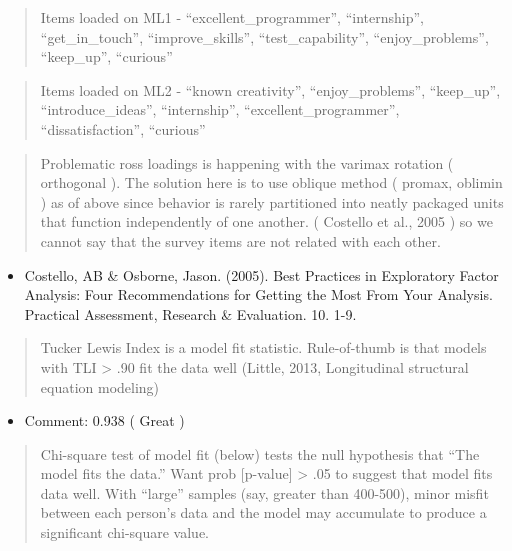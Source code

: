 \documentclass[
]{article}
\providecommand{\tightlist}{%
  \setlength{\itemsep}{0pt}\setlength{\parskip}{0pt}}
\begin{document}
\begin{quote}
Items loaded on ML1 - ``excellent\_programmer'', ``internship'',
``get\_in\_touch'', ``improve\_skills'', ``test\_capability'',
``enjoy\_problems'', ``keep\_up'', ``curious''
\end{quote}

\begin{quote}
Items loaded on ML2 - ``known creativity'', ``enjoy\_problems'',
``keep\_up'', ``introduce\_ideas'', ``internship'',
``excellent\_programmer'', ``dissatisfaction'', ``curious''
\end{quote}

\begin{quote}
Problematic ross loadings is happening with the varimax rotation (
orthogonal ). The solution here is to use oblique method ( promax,
oblimin ) as of above since behavior is rarely partitioned into neatly
packaged units that function independently of one another. ( Costello et
al., 2005 ) so we cannot say that the survey items are not related with
each other.
\end{quote}

\begin{itemize}
\tightlist
\item
  Costello, AB \& Osborne, Jason. (2005). Best Practices in Exploratory
  Factor Analysis: Four Recommendations for Getting the Most From Your
  Analysis. Practical Assessment, Research \& Evaluation. 10. 1-9.
\end{itemize}

\begin{quote}
Tucker Lewis Index is a model fit statistic. Rule-of-thumb is that
models with TLI \textgreater{} .90 fit the data well (Little, 2013,
Longitudinal structural equation modeling)
\end{quote}

\begin{itemize}
\tightlist
\item
  Comment: 0.938 ( Great )
\end{itemize}

\begin{quote}
Chi-square test of model fit (below) tests the null hypothesis that
``The model fits the data.'' Want prob {[}p-value{]} \textgreater{} .05
to suggest that model fits data well. With ``large'' samples (say,
greater than 400-500), minor misfit between each person's data and the
model may accumulate to produce a significant chi-square value.
\end{quote}
\end{document}
